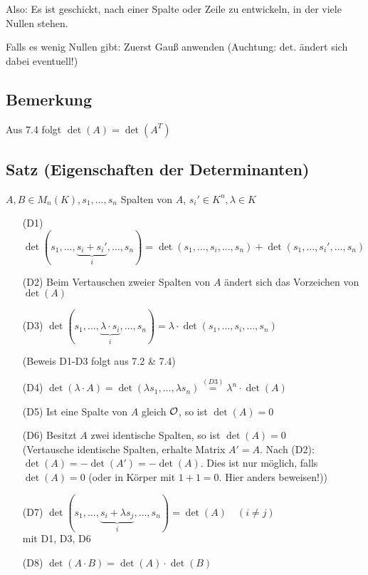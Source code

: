 Also: Es ist geschickt, nach einer Spalte oder Zeile zu entwickeln, in der viele Nullen stehen.

Falls es wenig Nullen gibt: Zuerst Gauß anwenden (Auchtung: det. ändert sich dabei eventuell!)

\subsection{Bemerkung}

Aus 7.4 %
folgt $\det(A)=\det(A^T)$


\subsection{Satz (Eigenschaften der Determinanten)}

$A, B \in M_n(K), s_1, \dots, s_n$ Spalten von $A$,
$s_i' \in K^n, \lambda \in K$

\begin{enumerate}
	\item[(D1)]
	$\det(s_1, \dots, \underbrace{s_i+s_i'}_{i}, \dots, s_n)
		= \det(s_1, \dots, s_i, \dots, s_n) 
			+ \det(s_1, \dots, s_i', \dots, s_n)$
			
	\item[(D2)]
	Beim Vertauschen zweier Spalten von $A$ ändert sich das Vorzeichen von $\det(A)$
	
	\item[(D3)]
	$\det(s_1, \dots, \underbrace{\lambda \cdot s_i}_{i}, \dots, s_n) = \lambda \cdot \det(s_1, \dots, s_i, \dots, s_n)$
	
	(Beweis D1-D3 folgt aus 7.2 \& 7.4) %
	
	\item[(D4)]
	$\det(\lambda \cdot A) = \det(\lambda s_1, \dots, \lambda s_n) \stackrel{(D3)}{=} \lambda^n \cdot \det(A)$
	
	\item[(D5)]
	Ist eine Spalte von $A$ gleich $\mathcal{O}$, so ist $\det(A) = 0$
	
	\item[(D6)]
	Besitzt $A$ zwei identische Spalten, so ist $\det(A) = 0$
	\\ (Vertausche identische Spalten, erhalte Matrix $A' = A$.
	Nach (D2): $\det(A)=-\det(A')=-\det(A)$.
	Dies ist nur möglich, falls $\det(A)=0$ (oder in Körper mit $1+1=0$. Hier anders beweisen!))
	
	\item[(D7)]
	$\det(s_1, \dots, \underbrace{s_i + \lambda s_j}_i, \dots, s_n) = \det(A) \quad (i \neq j)$
	\\	mit D1, D3, D6
	
	\item[(D8)]
	$\det(A \cdot B) = \det(A)\cdot\det(B)$
	
	
\end{enumerate} 


